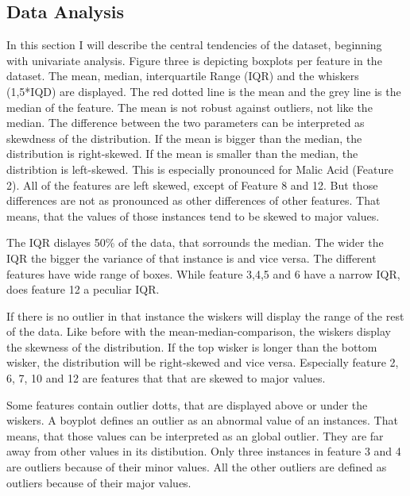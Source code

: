 
\subsection{Data Analysis}
In this section  I will describe the central tendencies of the dataset, beginning with univariate analysis.
Figure three is depicting boxplots per feature in the dataset.
The mean, median, interquartile Range (IQR) and the whiskers (1,5*IQD) are displayed.
The red dotted line is the mean and the grey line is the median of the feature.
The mean is not robust against outliers, not like the median. 
The difference between the two parameters can be interpreted as skewdness of the distribution. 
If the mean is bigger than the median, the distribution is right-skewed.
If the mean is smaller than the median, the distribtion is left-skewed.
This is especially pronounced for Malic Acid (Feature 2). 
All of the features are left skewed, except of Feature 8 and 12.
But those differences are not as pronounced as other differences of other features.
That means, that the values of those instances tend to be skewed to major values. 


The IQR dislayes 50\% of the data, that sorrounds the median.
The wider the IQR the bigger the variance of that instance is and vice versa. 
The different features have wide range of boxes. 
While feature 3,4,5 and 6 have a narrow IQR, does feature 12 a peculiar IQR.


If there is no outlier in that instance the wiskers will display the range of the rest of the data.
Like before with the mean-median-comparison, the wiskers display the skewness of the distribution.
If the top wisker is longer than the bottom wisker, the distribution will be right-skewed and vice versa. 
Especially feature 2, 6, 7, 10 and 12 are features that that are skewed to major values.




Some features contain outlier dotts, that are displayed above or under the wiskers.
A boyplot defines an outlier as an abnormal value of an instances.
That means, that those values can be interpreted as an global outlier.
They are far away from other values in its distibution. 
Only three instances in feature 3 and 4 are outliers because of their minor values.
All the other outliers are defined as outliers because of their major values. 


